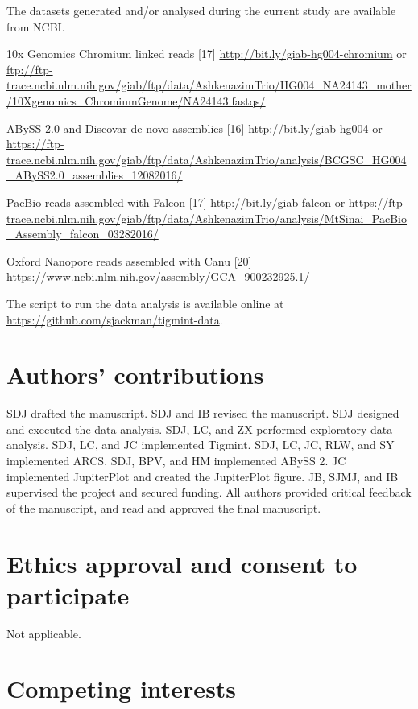 \documentclass{bmcart}
\begin{document}
\begin{backmatter}
The datasets generated and/or analysed during the current study are available from NCBI.

10x Genomics Chromium linked reads {[}17{]} \url{http://bit.ly/giab-hg004-chromium}
or \url{ftp://ftp-trace.ncbi.nlm.nih.gov/giab/ftp/data/AshkenazimTrio/HG004_NA24143_mother/10Xgenomics_ChromiumGenome/NA24143.fastqs/}

ABySS 2.0 and Discovar de novo assemblies {[}16{]} \url{http://bit.ly/giab-hg004}
or \url{https://ftp-trace.ncbi.nlm.nih.gov/giab/ftp/data/AshkenazimTrio/analysis/BCGSC_HG004_ABySS2.0_assemblies_12082016/}

PacBio reads assembled with Falcon {[}17{]} \url{http://bit.ly/giab-falcon}
or \url{https://ftp-trace.ncbi.nlm.nih.gov/giab/ftp/data/AshkenazimTrio/analysis/MtSinai_PacBio_Assembly_falcon_03282016/}

Oxford Nanopore reads assembled with Canu {[}20{]}
\url{https://www.ncbi.nlm.nih.gov/assembly/GCA_900232925.1/}

The script to run the data analysis is available online at \url{https://github.com/sjackman/tigmint-data}.

\hypertarget{authors-contributions}{%
\section*{Authors' contributions}\label{authors-contributions}}

SDJ drafted the manuscript. SDJ and IB revised the manuscript. SDJ designed and executed the data analysis. SDJ, LC, and ZX performed exploratory data analysis. SDJ, LC, and JC implemented Tigmint. SDJ, LC, JC, RLW, and SY implemented ARCS. SDJ, BPV, and HM implemented ABySS 2. JC implemented JupiterPlot and created the JupiterPlot figure. JB, SJMJ, and IB supervised the project and secured funding. All authors provided critical feedback of the manuscript, and read and approved the final manuscript.

\hypertarget{ethics-approval-and-consent-to-participate}{%
\section*{Ethics approval and consent to participate}\label{ethics-approval-and-consent-to-participate}}

Not applicable.

\hypertarget{competing-interests}{%
\section*{Competing interests}\label{competing-interests}}


\end{backmatter}
\end{document}

